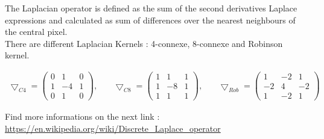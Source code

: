 \documentclass[12pt,a4paper]{article}
\begin{document}
The Laplacian operator is defined as the sum of the second derivatives Laplace expressions and calculated as sum of differences over the nearest neighbours of the central pixel.\\

There are different Laplacian Kernels : 4-connexe, 8-connexe and Robinson kernel.\\

\begin{center}
$
\begin{matrix}
\bigtriangledown_{C4} = \begin{pmatrix}
0 & 1 & 0\\ 
1 & -4 & 1\\ 
0 & 1 & 0
\end{pmatrix} ,\quad  & \bigtriangledown_{C8} = \begin{pmatrix}
1 & 1 & 1\\ 
1 & -8 & 1\\ 
1 & 1 & 1
\end{pmatrix} ,\quad  &
\bigtriangledown_{Rob} = \begin{pmatrix}
1 & -2 & 1\\ 
-2 & 4 & -2\\ 
1 & -2 & 1
\end{pmatrix}  
\end{matrix}
$
\end{center}

\vspace{0.5cm}

Find more informations on the next link :\\

\url{https://en.wikipedia.org/wiki/Discrete_Laplace_operator}
\end{document}
